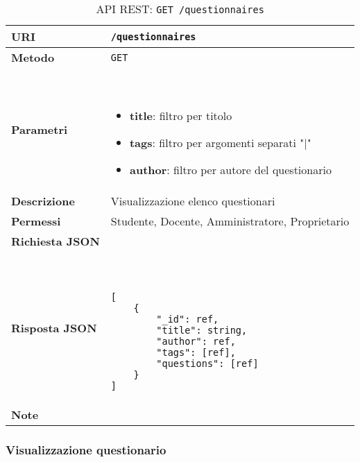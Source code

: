         \begin{table}[H]
            \begin{center}
                \begin{tabular}{p{} p{}}
                    \toprule
                    \textbf{URI} & \texttt{/questionnaires} \\ \midrule
                    \textbf{Metodo} & \texttt{GET} \\ \midrule
                    \textbf{Parametri} & \
                        \begin{itemize}
                            \item \textbf{title}: filtro per titolo
                            \item \textbf{tags}: filtro per argomenti separati "|" 
                            \item \textbf{author}: filtro per autore del questionario
                        \end{itemize}
                        \\ \midrule
                    \textbf{Descrizione} & Visualizzazione elenco questionari \\ \midrule
                    \textbf{Permessi} & Studente, Docente, Amministratore, Proprietario  \\ \midrule
                    \textbf{Richiesta JSON} & \\ \midrule
                    \textbf{Risposta JSON} & \
                        \begin{lstlisting}[basicstyle={\ttfamily}]
[
    {
        "_id": ref,
        "title": string,
        "author": ref,
        "tags": [ref],
        "questions": [ref] 
    }
]
                        \end{lstlisting}
                        \\ \midrule
                    \textbf{Note} & \\
                    \bottomrule
                \end{tabular}
                \caption{API REST: \texttt{GET /questionnaires}}
            \end{center}
        \end{table}

    \subsubsection{Visualizzazione questionario}

